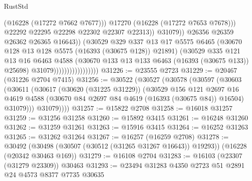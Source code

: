 \begin{lexlean}{RustStd}
\begin{coremodule}
                                                  (@16228 (@17272 @7662 @7677)))
                                                @17270
                                                (@16228 (@17272 @7653 @7678)))
                                              @22292
                                              @22295
                                              @22298
                                              @22302
                                              @22307
                                              @22313))
                                          @31079))
                                      @26356
                                      @26359
                                      @26362
                                      @26365
                                      @16643))
                                  (@30529
                                    @329
                                    @337
                                    @13
                                    @17
                                    @5575
                                    @6465
                                    (@30670 @128 @13 @128 @5575 (@16393 (@30675 @128)) @21891)
                                    (@30529
                                      @335
                                      @121
                                      @13
                                      @16
                                      @6463
                                      @4588
                                      (@30670 @133 @13 @133 @6463 (@16393 (@30675 @133)) @25698)
                                      @31079)))))))))))))))))
@31226 := @23555 @2723
@31229 := @20467 (@31226 @2704 @7415)
@31256 := @30522
    (@30527
      (@30578
        (@30597
          (@30603
            (@30611
              (@30617
                (@30620 (@31225 @31229))
                (@30529
                  @156
                  @121
                  @2697
                  @16
                  @4619
                  @4588
                  (@30670 @84 @2697 @84 @4619 (@16393 (@30675 @84)) @16504)
                  @31079)))
            @31079))))
@31257 := @15822 @2708
@31258 := @16018 @31257
@31259 := @31256 @31258
@31260 := @15892 @3415
@31261 := @16248 @31260
@31262 := @31259 @31261
@31263 := @15916 @3415
@31264 := @16252 @31263
@31265 := @31262 @31264
@31267 := @16257 (@16259 @2708)
@31278 := @30492
    (@30498 (@30507 (@30512 (@31265 @31267 @16643)) @19293))
    (@16228 (@20342 @30463 @169))
@31279 := @16108 @2704
@31283 := @16103 (@23307 (@31279 @23309)) @30463
@31293 := @23494 @31283 @4350 @2723 @51 @2891 @24 @4573 @8377 @7735 @30635

\end{coremodule}
\end{lexlean}
